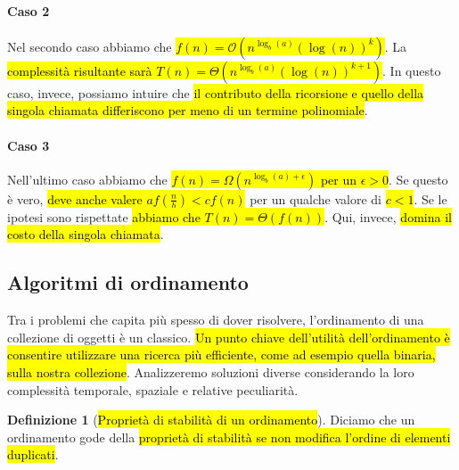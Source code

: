 \documentclass[a4paper,11pt,oneside]{article}
\theoremstyle{plain}
\theoremstyle{definition}
\newtheorem{defn}{Definizione}[section]
\theoremstyle{remark}
\begin{document}
\paragraph{Caso 2} Nel secondo caso abbiamo che \hl{$f(n) =
\mathcal{O}(n^{\log_b(a)}{(\log(n))}^k)$}. La \hl{complessità risultante sarà
$T(n) = \Theta(n^{\log_b(a)}{(\log(n))}^{k+1})$}. In questo caso, invece,
possiamo intuire che \hl{il contributo della ricorsione e quello della singola
chiamata differiscono per meno di un termine polinomiale}.

\paragraph{Caso 3} Nell'ultimo caso abbiamo che \hl{$f(n) = \Omega(n^{\log_b(a)
+ \epsilon})$ per un $\epsilon >0$}. Se questo è vero, \hl{deve anche valere
$af(\frac{n}{b})<cf(n)$} per un qualche valore di \hl{$c<1$}. Se le ipotesi sono
rispettate \hl{abbiamo che $T(n) = \Theta(f(n))$}. Qui, invece, \hl{domina il
costo della singola chiamata}.

\subsection{Algoritmi di ordinamento}\label{sec:alg-odinamento}

Tra i problemi che capita più spesso di dover risolvere, l'ordinamento di una
collezione di oggetti è un classico. \hl{Un punto chiave dell'utilità
dell'ordinamento è consentire utilizzare una ricerca più efficiente, come ad
esempio quella binaria, sulla nostra collezione}. Analizzeremo soluzioni diverse
considerando la loro complessità temporale, spaziale e relative peculiarità.

\begin{defn}[\hl{Proprietà di stabilità di un ordinamento}]\label{def:prop-stabilita}
  Diciamo che un ordinamento gode della \hl{proprietà di stabilità se non modifica
  l'ordine di elementi duplicati}.
\end{defn}
\end{document}
